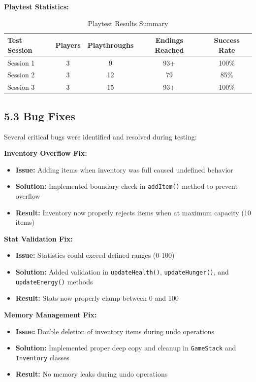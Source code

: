 \documentclass[12pt,a4paper]{article}
\begin{document}
\textbf{Playtest Statistics:}
\begin{table}[h]
	\centering
	\caption{Playtest Results Summary}
	\begin{tabular}{@{}lcccc@{}}
		\toprule
		\textbf{Test Session} & \textbf{Players} & \textbf{Playthroughs} & \textbf{Endings Reached} & \textbf{Success Rate} \\ \midrule
		Session 1           & 3                & 9                    & 93+                      & 100\%                 \\
		Session 2           & 3                & 12                   & 79                       & 85\%                  \\
		Session 3           & 3                & 15                   & 93+                      & 100\%                 \\
		\bottomrule
	\end{tabular}
\end{table}

\vspace{0.3cm}

\subsection{5.3 Bug Fixes}
Several critical bugs were identified and resolved during testing:

\textbf{Inventory Overflow Fix:}
\begin{itemize}
	\item \textbf{Issue:} Adding items when inventory was full caused undefined behavior
	\item \textbf{Solution:} Implemented boundary check in \texttt{addItem()} method to prevent overflow
	\item \textbf{Result:} Inventory now properly rejects items when at maximum capacity (10 items)
\end{itemize}

\textbf{Stat Validation Fix:}
\begin{itemize}
	\item \textbf{Issue:} Statistics could exceed defined ranges (0-100)
	\item \textbf{Solution:} Added validation in \texttt{updateHealth()}, \texttt{updateHunger()}, and \texttt{updateEnergy()} methods
	\item \textbf{Result:} Stats now properly clamp between 0 and 100
\end{itemize}

\textbf{Memory Management Fix:}
\begin{itemize}
	\item \textbf{Issue:} Double deletion of inventory items during undo operations
	\item \textbf{Solution:} Implemented proper deep copy and cleanup in \texttt{GameStack} and \texttt{Inventory} classes
	\item \textbf{Result:} No memory leaks during undo operations
\end{itemize}
\end{document}
